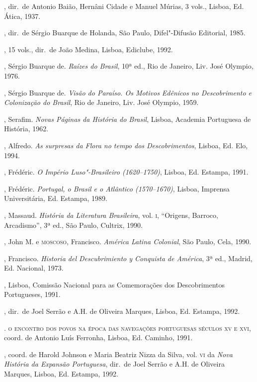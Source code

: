 \begin{bibliohedra}
, dir.~de Antonio
Baião, Hernâni Cidade e Manuel Múrias, 3 vols., Lisboa, Ed. Ática, 1937.

, dir.~de Sérgio
Buarque de Holanda, São Paulo, Difel"-Difusão Editorial, 1985.

, 15 vols., dir.~de João
Medina, Lisboa, Ediclube, 1992.

, Sérgio Buarque de. \textit{Raízes do Brasil}, 10ª ed., Rio de
Janeiro, Liv. José Olympio, 1976.

, Sérgio Buarque de. \textit{Visão do Paraíso. Os Motivos
Edênicos no Descobrimento e Colonização do Brasil}, Rio de Janeiro,
Liv. José Olympio, 1959.

, Serafim. \textit{Novas Páginas da História do Brasil}, Lisboa,
Academia Portuguesa de História, 1962.

, Alfredo. \textit{As surpresas da Flora no tempo dos
Descobrimentos}, Lisboa, Ed. Elo, 1994.

, Frédéric. \textit{O Império Luso"-Brasileiro (1620--1750)}, 
Lisboa, Ed. Estampa, 1991.

, Frédéric. \textit{Portugal, o Brasil e o Atlântico (1570--1670)}, 
Lisboa, Imprensa Universitária, Ed. Estampa, 1989.

, Massaud. \textit{História da Literatura Brasileira}, vol. \textsc{i},
``Origens, Barroco, Arcadismo'', 3ª ed., São Paulo, Cultrix, 1990.

, John M. e \textsc{moscoso}, Francisco. \textit{América Latina
Colonial}, São Paulo, Cela, 1990.

, Francisco. \textit{Historia del Descubrimiento y
Conquista de América}, 3ª ed., Madrid, Ed. Nacional, 1973.

, Lisboa, Comissão
Nacional para as Comemorações dos Descobrimentos Portugueses, 1991.

, dir.~de Joel Serrão e
A.H. de Oliveira Marques, Lisboa, Ed. Estampa, 1992.

. \textsc{o encontro dos povos na época das
navegações portuguesas séculos xv e xvi}, coord. de Antonio Luís
Ferronha, Lisboa, Ed. Caminho, 1991.

, coord. de Harold
Johnson e Maria Beatriz Nizza da Silva, vol. \textsc{vi} da \textit{Nova
História da Expansão Portuguesa}, dir.~de Joel Serrão e A.H. de Oliveira
Marques, Lisboa, Ed. Estampa, 1992.


\end{bibliohedra}
